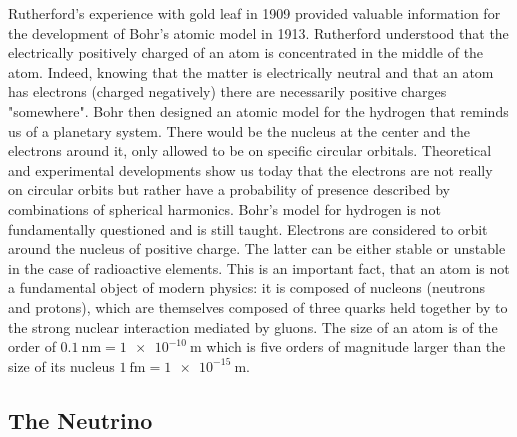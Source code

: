Rutherford's experience with gold leaf in 1909 provided valuable information for the development of Bohr's atomic model in 1913. Rutherford understood that the electrically positively charged of an atom is concentrated in the middle of the atom. Indeed, knowing that the matter is electrically neutral and that an atom has electrons (charged negatively) there are necessarily positive charges "somewhere". Bohr then designed an atomic model for the hydrogen that reminds us of a planetary system. There would be the nucleus at the center and the electrons around it, only allowed to be on specific circular orbitals.
Theoretical and experimental developments show us today that the electrons are not really on circular orbits but rather have a probability of presence described by combinations of spherical harmonics. Bohr's model for hydrogen is not fundamentally questioned and is still taught. Electrons are considered to orbit around the nucleus of positive charge. The latter can be either stable or unstable in the case of radioactive elements. 
This is an important fact, that an atom is not a fundamental object of modern physics: it is composed of nucleons (neutrons and protons), which are themselves composed of three quarks held together by to the strong nuclear interaction mediated by gluons. The size of an atom is of the order of $\SI{0.1}{\nano\m} = \SI{1e-10}{\m}$ which is five orders of magnitude larger than the size of its nucleus $\SI{1}{\femto\m} = \SI{1e-15}{\m}$.


\subsection{The Neutrino}

